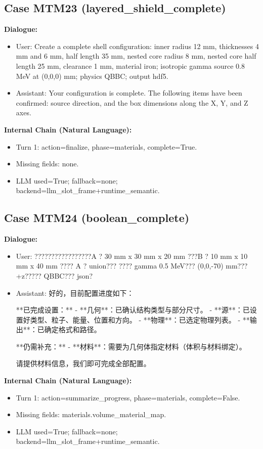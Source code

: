 \documentclass[11pt]{ctexart}
\begin{document}
\subsection{Case MTM23 (layered\_shield\_complete)}
\textbf{Dialogue:}
\begin{itemize}
\item User: Create a complete shell configuration: inner radius 12 mm, thicknesses 4 mm and 6 mm, half length 35 mm, nested core radius 8 mm, nested core half length 25 mm, clearance 1 mm, material iron; isotropic gamma source 0.8 MeV at (0,0,0) mm; physics QBBC; output hdf5.
\item Assistant: Your configuration is complete. The following items have been confirmed: source direction, and the box dimensions along the X, Y, and Z axes.
\end{itemize}
\textbf{Internal Chain (Natural Language):}
\begin{itemize}
\item Turn 1: action=finalize, phase=materials, complete=True.
\item Missing fields: none.
\item LLM used=True; fallback=none; backend=llm\_slot\_frame+runtime\_semantic.
\end{itemize}
\subsection{Case MTM24 (boolean\_complete)}
\textbf{Dialogue:}
\begin{itemize}
\item User: ?????????????????A ? 30 mm x 30 mm x 20 mm ???B ? 10 mm x 10 mm x 40 mm ???? A ? union??? ???? gamma 0.5 MeV??? (0,0,-70) mm??? +z????? QBBC??? json?
\item Assistant: 好的，目前配置进度如下：

**已完成设置：**
- **几何**：已确认结构类型与部分尺寸。
- **源**：已设置好类型、粒子、能量、位置和方向。
- **物理**：已选定物理列表。
- **输出**：已确定格式和路径。

**仍需补充：**
- **材料**：需要为几何体指定材料（体积与材料绑定）。

请提供材料信息，我们即可完成全部配置。
\end{itemize}
\textbf{Internal Chain (Natural Language):}
\begin{itemize}
\item Turn 1: action=summarize\_progress, phase=materials, complete=False.
\item Missing fields: materials.volume\_material\_map.
\item LLM used=True; fallback=none; backend=llm\_slot\_frame+runtime\_semantic.
\end{itemize}
\end{document}
